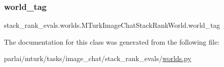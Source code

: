 \subsubsection{\texorpdfstring{world\+\_\+tag}{world\_tag}}
{\footnotesize\ttfamily stack\+\_\+rank\+\_\+evals.\+worlds.\+M\+Turk\+Image\+Chat\+Stack\+Rank\+World.\+world\+\_\+tag}



The documentation for this class was generated from the following file\+:\begin{DoxyCompactItemize}
\item 
parlai/mturk/tasks/image\+\_\+chat/stack\+\_\+rank\+\_\+evals/\hyperlink{parlai_2mturk_2tasks_2image__chat_2stack__rank__evals_2worlds_8py}{worlds.\+py}\end{DoxyCompactItemize}
